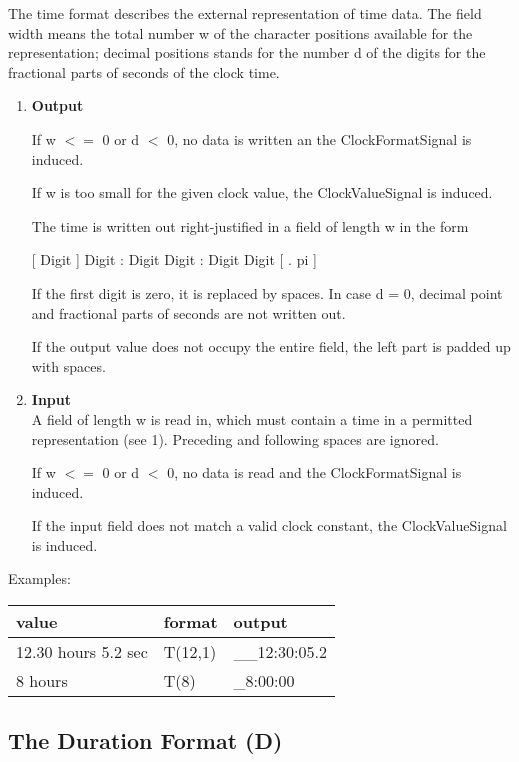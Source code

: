 The time format describes the external representation of time data. The
field width means the total number w of the character positions
available for the representation; decimal positions stands for the
number d of the digits for the fractional parts of seconds of the clock
time.
\begin{enumerate}
\item {\bf Output}\\
\begin{added}
If w $<=$ 0 or d $<$ 0, no data is written an the ClockFormatSignal
   is induced.

If w is too small for the given clock value, the ClockValueSignal
   is induced.
\end{added}

The time is written out right-justified in a field of length w in the
form

[ Digit ] Digit : Digit Digit : Digit Digit [ . pi ]

If the first digit is zero, it is replaced by spaces. In case d = 0,
decimal point and fractional parts of seconds are not written out.

If the output value does not occupy the entire field, the left part is
padded up with spaces.
\item {\bf Input}\\
A field of length w is read in, which must contain a time in a permitted
representation (see 1). Preceding and following spaces are ignored.

\begin{added}
If w $<=$ 0 or d $<$ 0, no data is read and the ClockFormatSignal
   is induced.

If the input field does not match a valid clock constant, the 
   ClockValueSignal is induced.
\end{added}
\end{enumerate}

Examples:

\begin{tabular}{lll}
value               & format  & output \\ \hline
12.30 hours 5.2 sec & T(12,1) & \_\_12:30:05.2 \\
8 hours             & T(8)    & \_8:00:00
\end{tabular}

\subsection{The Duration Format (D)}   %
\label{sec_dation_d_format}


